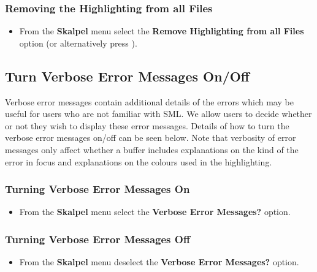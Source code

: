 \documentclass{article}
\begin{document}
\subsubsection{Removing the Highlighting from all Files}

\begin{itemize}
\item From the \textbf{Skalpel} menu select the \textbf{Remove
  Highlighting from all Files} option (or alternatively press
  ).
\end{itemize}


\subsection{Turn Verbose Error Messages On/Off}

Verbose error messages contain additional details of the errors which
may be useful for users who are not familiar with SML.  We allow users
to decide whether or not they wish to display these error messages.
Details of how to turn the verbose error messages on/off can be seen
below.  Note that verbosity of error messages only affect whether a
buffer includes explanations on the kind of the error in focus and
explanations on the colours used in the highlighting.

\subsubsection{Turning Verbose Error Messages On}

  \begin{itemize}
  \item From the \textbf{Skalpel}
    menu select the \textbf{Verbose Error Messages?} option.
  \end{itemize}

\subsubsection{Turning Verbose Error Messages Off}

  \begin{itemize}
  \item From the \textbf{Skalpel} menu
    deselect the \textbf{Verbose Error Messages?} option.
  \end{itemize}
\end{document}
